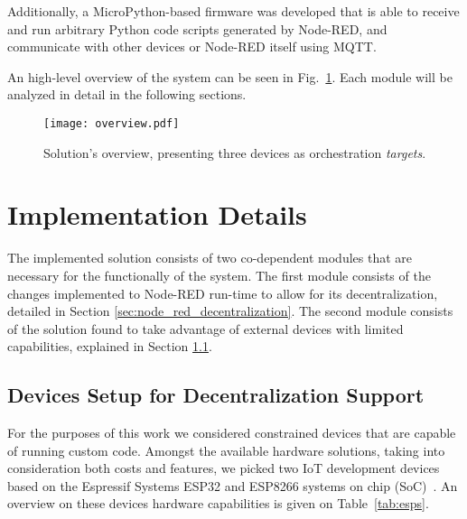 Additionally, a MicroPython-based firmware was developed that is able to receive and run arbitrary Python code scripts generated by Node-RED, and communicate with other devices or Node-RED itself using MQTT. 

An high-level overview of the system can be seen in Fig.~\ref{fig:solution_overview}. Each module will be analyzed in detail in the following sections.

\begin{figure}[h]
    \centering
    \texttt{[image: overview.pdf]}
    \caption{Solution's overview, presenting three devices as orchestration \textit{targets}.}
    \label{fig:solution_overview}
\end{figure}

\section{Implementation Details}\label{sec:implementation_details}

The implemented solution consists of two co-dependent modules that are necessary for the functionally of the system. The first module consists of the changes implemented to Node-RED run-time to allow for its decentralization, detailed in Section \ref{sec:node_red_decentralization}. The second module consists of the solution found to take advantage of external devices with limited capabilities, explained in Section \ref{sec:devices_decentralization}.

\subsection{Devices Setup for Decentralization Support}\label{sec:devices_decentralization}

For the purposes of this work we considered constrained devices that are capable of running custom code. Amongst the available hardware solutions, taking into consideration both costs and features, we picked two IoT development devices based on the Espressif Systems ESP32 and ESP8266 systems on chip (SoC)~\cite{esp32,esp8266}. An overview on these devices hardware capabilities is given on Table~\ref{tab:esps}.

